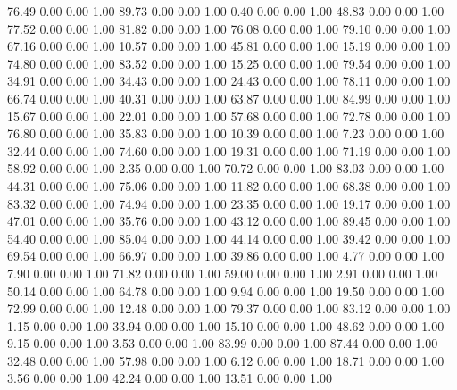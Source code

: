    76.49   0.00   0.00   1.00
   89.73   0.00   0.00   1.00
    0.40   0.00   0.00   1.00
   48.83   0.00   0.00   1.00
   77.52   0.00   0.00   1.00
   81.82   0.00   0.00   1.00
   76.08   0.00   0.00   1.00
   79.10   0.00   0.00   1.00
   67.16   0.00   0.00   1.00
   10.57   0.00   0.00   1.00
   45.81   0.00   0.00   1.00
   15.19   0.00   0.00   1.00
   74.80   0.00   0.00   1.00
   83.52   0.00   0.00   1.00
   15.25   0.00   0.00   1.00
   79.54   0.00   0.00   1.00
   34.91   0.00   0.00   1.00
   34.43   0.00   0.00   1.00
   24.43   0.00   0.00   1.00
   78.11   0.00   0.00   1.00
   66.74   0.00   0.00   1.00
   40.31   0.00   0.00   1.00
   63.87   0.00   0.00   1.00
   84.99   0.00   0.00   1.00
   15.67   0.00   0.00   1.00
   22.01   0.00   0.00   1.00
   57.68   0.00   0.00   1.00
   72.78   0.00   0.00   1.00
   76.80   0.00   0.00   1.00
   35.83   0.00   0.00   1.00
   10.39   0.00   0.00   1.00
    7.23   0.00   0.00   1.00
   32.44   0.00   0.00   1.00
   74.60   0.00   0.00   1.00
   19.31   0.00   0.00   1.00
   71.19   0.00   0.00   1.00
   58.92   0.00   0.00   1.00
    2.35   0.00   0.00   1.00
   70.72   0.00   0.00   1.00
   83.03   0.00   0.00   1.00
   44.31   0.00   0.00   1.00
   75.06   0.00   0.00   1.00
   11.82   0.00   0.00   1.00
   68.38   0.00   0.00   1.00
   83.32   0.00   0.00   1.00
   74.94   0.00   0.00   1.00
   23.35   0.00   0.00   1.00
   19.17   0.00   0.00   1.00
   47.01   0.00   0.00   1.00
   35.76   0.00   0.00   1.00
   43.12   0.00   0.00   1.00
   89.45   0.00   0.00   1.00
   54.40   0.00   0.00   1.00
   85.04   0.00   0.00   1.00
   44.14   0.00   0.00   1.00
   39.42   0.00   0.00   1.00
   69.54   0.00   0.00   1.00
   66.97   0.00   0.00   1.00
   39.86   0.00   0.00   1.00
    4.77   0.00   0.00   1.00
    7.90   0.00   0.00   1.00
   71.82   0.00   0.00   1.00
   59.00   0.00   0.00   1.00
    2.91   0.00   0.00   1.00
   50.14   0.00   0.00   1.00
   64.78   0.00   0.00   1.00
    9.94   0.00   0.00   1.00
   19.50   0.00   0.00   1.00
   72.99   0.00   0.00   1.00
   12.48   0.00   0.00   1.00
   79.37   0.00   0.00   1.00
   83.12   0.00   0.00   1.00
    1.15   0.00   0.00   1.00
   33.94   0.00   0.00   1.00
   15.10   0.00   0.00   1.00
   48.62   0.00   0.00   1.00
    9.15   0.00   0.00   1.00
    3.53   0.00   0.00   1.00
   83.99   0.00   0.00   1.00
   87.44   0.00   0.00   1.00
   32.48   0.00   0.00   1.00
   57.98   0.00   0.00   1.00
    6.12   0.00   0.00   1.00
   18.71   0.00   0.00   1.00
    3.56   0.00   0.00   1.00
   42.24   0.00   0.00   1.00
   13.51   0.00   0.00   1.00
